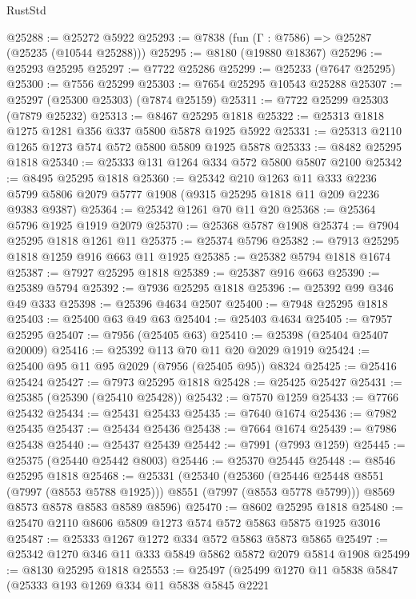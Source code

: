 \begin{lexlean}{RustStd}
\begin{coremodule}
@25288 := @25272 @5922
@25293 := @7838 (fun (Γ : @7586) => @25287 (@25235 (@10544 @25288)))
@25295 := @8180 (@19880 @18367)
@25296 := @25293 @25295
@25297 := @7722 @25286
@25299 := @25233 (@7647 @25295)
@25300 := @7556 @25299
@25303 := @7654 @25295 @10543 @25288
@25307 := @25297 (@25300 @25303) (@7874 @25159)
@25311 := @7722 @25299 @25303 (@7879 @25232)
@25313 := @8467 @25295 @1818
@25322 := @25313 @1818 @1275 @1281 @356 @337 @5800 @5878 @1925 @5922
@25331 := @25313 @2110 @1265 @1273 @574 @572 @5800 @5809 @1925 @5878
@25333 := @8482 @25295 @1818
@25340 := @25333 @131 @1264 @334 @572 @5800 @5807 @2100
@25342 := @8495 @25295 @1818
@25360 := @25342
    @210
    @1263
    @11
    @333
    @2236
    @5799
    @5806
    @2079
    @5777
    @1908
    (@9315 @25295 @1818 @11 @209 @2236 @9383 @9387)
@25364 := @25342 @1261 @70 @11 @20
@25368 := @25364 @5796 @1925 @1919 @2079
@25370 := @25368 @5787 @1908
@25374 := @7904 @25295 @1818 @1261 @11
@25375 := @25374 @5796
@25382 := @7913 @25295 @1818 @1259 @916 @663 @11 @1925
@25385 := @25382 @5794 @1818 @1674
@25387 := @7927 @25295 @1818
@25389 := @25387 @916 @663
@25390 := @25389 @5794
@25392 := @7936 @25295 @1818
@25396 := @25392 @99 @346 @49 @333
@25398 := @25396 @4634 @2507
@25400 := @7948 @25295 @1818
@25403 := @25400 @63 @49 @63
@25404 := @25403 @4634
@25405 := @7957 @25295
@25407 := @7956 (@25405 @63)
@25410 := @25398 (@25404 @25407 @20009)
@25416 := @25392 @113 @70 @11 @20 @2029 @1919
@25424 := @25400 @95 @11 @95 @2029 (@7956 (@25405 @95)) @8324
@25425 := @25416 @25424
@25427 := @7973 @25295 @1818
@25428 := @25425 @25427
@25431 := @25385 (@25390 (@25410 @25428))
@25432 := @7570 @1259
@25433 := @7766 @25432
@25434 := @25431 @25433
@25435 := @7640 @1674
@25436 := @7982 @25435
@25437 := @25434 @25436
@25438 := @7664 @1674
@25439 := @7986 @25438
@25440 := @25437 @25439
@25442 := @7991 (@7993 @1259)
@25445 := @25375 (@25440 @25442 @8003)
@25446 := @25370 @25445
@25448 := @8546 @25295 @1818
@25468 := @25331
    (@25340
      (@25360 (@25446 @25448 @8551 (@7997 (@8553 @5788 @1925))) @8551 (@7997 (@8553 @5778 @5799)))
      @8569
      @8573
      @8578
      @8583
      @8589
      @8596)
@25470 := @8602 @25295 @1818
@25480 := @25470 @2110 @8606 @5809 @1273 @574 @572 @5863 @5875 @1925 @3016
@25487 := @25333 @1267 @1272 @334 @572 @5863 @5873 @5865
@25497 := @25342 @1270 @346 @11 @333 @5849 @5862 @5872 @2079 @5814 @1908
@25499 := @8130 @25295 @1818
@25553 := @25497
    (@25499
      @1270
      @11
      @5838
      @5847
      (@25333
        @193
        @1269
        @334
        @11
        @5838
        @5845
        @2221

\end{coremodule}
\end{lexlean}
